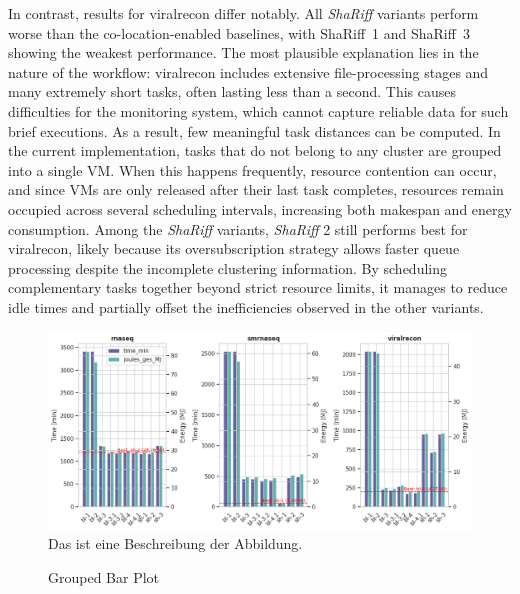 In contrast, results for viralrecon differ notably. All \textit{ShaRiff} variants perform worse than the co-location-enabled baselines, with ShaRiff~1 and ShaRiff~3 showing the weakest performance. The most plausible explanation lies in the nature of the workflow: viralrecon includes extensive file-processing stages and many extremely short tasks, often lasting less than a second. This causes difficulties for the monitoring system, which cannot capture reliable data for such brief executions. As a result, few meaningful task distances can be computed. In the current implementation, tasks that do not belong to any cluster are grouped into a single VM. When this happens frequently, resource contention can occur, and since VMs are only released after their last task completes, resources remain occupied across several scheduling intervals, increasing both makespan and energy consumption.
Among the \textit{ShaRiff} variants, \textit{ShaRiff} 2 still performs best for viralrecon, likely because its oversubscription strategy allows faster queue processing despite the incomplete clustering information. By scheduling complementary tasks together beyond strict resource limits, it manages to reduce idle times and partially offset the inefficiencies observed in the other variants.

\begin{figure}[H]
    \caption{Grouped Bar Plot}
    \includegraphics[scale=0.5]{fig/06/06-grouped-bar-3wfs.png}
    \label{fig:grouped_bar_3wfs}
    \newline
    \tiny
    Das ist eine Beschreibung der Abbildung.
\end{figure}

